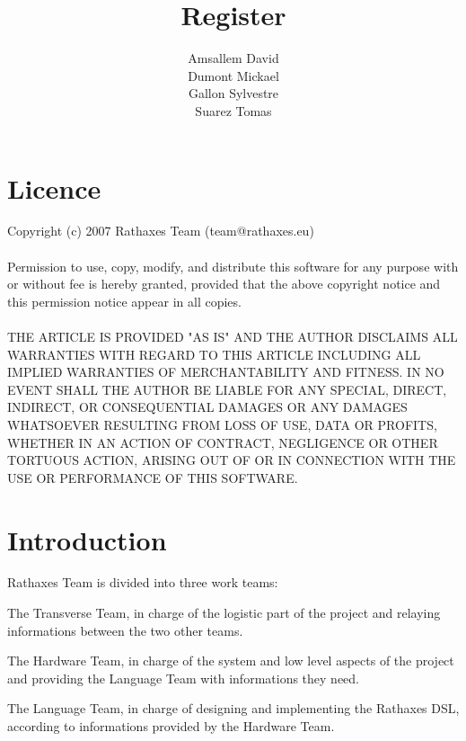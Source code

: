 \documentclass[11pt]{report}
\begin{document}
\author{Amsallem David\\Dumont Mickael\\Gallon Sylvestre\\Suarez Tomas}
\title{Register}
\maketitle

\section*{Licence}
Copyright (c) 2007 Rathaxes Team (team@rathaxes.eu)
\\\\
Permission to use, copy, modify, and distribute this software for any
purpose with or without fee is hereby granted, provided that the above
copyright notice and this permission notice appear in all copies.
\\\\
THE ARTICLE IS PROVIDED "AS IS" AND THE AUTHOR DISCLAIMS ALL WARRANTIES
WITH REGARD TO THIS ARTICLE INCLUDING ALL IMPLIED WARRANTIES OF
MERCHANTABILITY AND FITNESS. IN NO EVENT SHALL THE AUTHOR BE LIABLE FOR
ANY SPECIAL, DIRECT, INDIRECT, OR CONSEQUENTIAL DAMAGES OR ANY DAMAGES
WHATSOEVER RESULTING FROM LOSS OF USE, DATA OR PROFITS, WHETHER IN AN
ACTION OF CONTRACT, NEGLIGENCE OR OTHER TORTUOUS ACTION, ARISING OUT OF
OR IN CONNECTION WITH THE USE OR PERFORMANCE OF THIS SOFTWARE.
\newpage

\section*{Introduction}

Rathaxes Team is divided into three work teams:\\
\begin{description}
  \item{The Transverse Team, in charge of the logistic part of the project and
    relaying informations between the two other teams.}
  \item{The Hardware Team, in charge of the system and low level aspects of the
    project and providing the Language Team with informations they need.}
  \item{The Language Team, in charge of designing and implementing the Rathaxes
    DSL, according to informations provided by the Hardware Team.\\}
\end{description}
\end{document}
